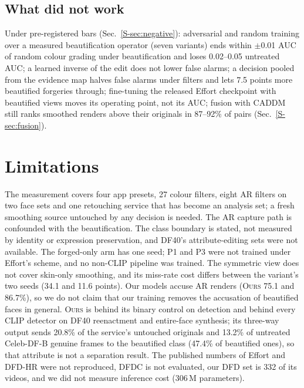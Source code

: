 \documentclass[conference]{IEEEtran}
\newcommand{\ours}{\textsc{Ours}}
\begin{document}
\subsection{What did not work}
\label{sec:negative}
Under pre-registered bars (Sec.~\ref{S-sec:negative}): adversarial and random training over a measured beautification operator
(seven variants) ends within $\pm$0.01 AUC of random colour grading under beautification and loses 0.02--0.05 untreated AUC; a
learned inverse of the edit does not lower false alarms; a decision pooled from the evidence map halves false alarms under
filters and lets 7.5 points more beautified forgeries through; fine-tuning the released Effort checkpoint with beautified views
moves its operating point, not its AUC; fusion with CADDM still ranks smoothed renders above their originals in 87--92\% of pairs
(Sec.~\ref{S-sec:fusion}).

\section{Limitations}
The measurement covers four app presets, 27 colour filters, eight AR filters on two face sets and one retouching service that has
become an analysis set; a fresh smoothing source untouched by any decision is needed. The AR capture path is confounded with the
beautification. The class boundary is stated, not measured by identity or expression preservation, and DF40's attribute-editing
sets were not available. The forged-only arm has one seed; P1 and P3 were not trained under Effort's scheme, and no non-CLIP
pipeline was trained. The symmetric view does not cover skin-only smoothing, and its miss-rate cost differs between the variant's
two seeds (34.1 and 11.6 points). Our models accuse AR renders (\ours{} 75.1 and 86.7\%), so we do not claim that our training
removes the accusation of beautified faces in general. \ours{} is behind its binary control on detection and behind every CLIP
detector on DF40 reenactment and entire-face synthesis; its three-way output sends 20.8\% of the service's untouched originals and
13.2\% of untreated Celeb-DF-B genuine frames to the beautified class (47.4\% of beautified ones), so that attribute is not a
separation result. The published numbers of Effort and DFD-HR were not reproduced, DFDC is not evaluated, our DFD set is 332 of its
videos, and we did not measure inference cost (306\,M parameters).
\end{document}
